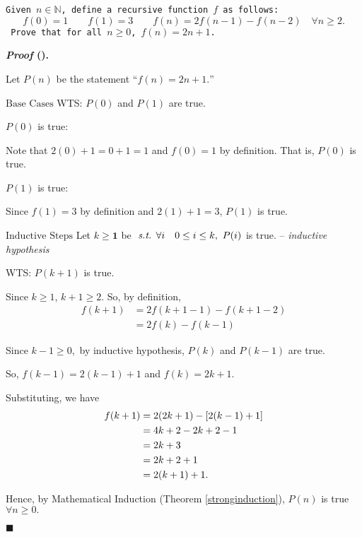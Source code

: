 \documentclass[12pt,a4paper]{article}
\newcounter{nprf}[subsection]
\newenvironment*{prf}{\par\indent\textbf{\textit{Proof} (\stepcounter{nprf}\thenprf). }\par}{\par\hfill $\blacksquare$\par}
\def\N{{\mathbb{N}}}
\def\st{\emph{ s.t. }}
\begin{document}
\begin{framed}
\noindent\texttt{Given $n\in\N$, define a recursive function $f$ as follows: \[f(0)=1\qquad f(1)=3\qquad f(n)=2f(n-1)-f(n-2)\quad\forall n\geq2.\] Prove that for all $n\geq0$, $f(n)=2n+1$.}
\begin{prf}
	Let $P(n)$ be the statement ``$f(n)=2n+1.$''\par$\boxed{\text{Base Cases}}$ 	WTS: $P(0)$ and $P(1)$ are true.\par\hspace{5mm} $P(0)$ is true: \big[WTS: $f(0)=2(0)+1$\big]\par\hspace{10mm}Note that $2(0)+1=0+1=1$ and $f(0)=1$ by definition. That is, $P(0)$ is true.\par\hspace{5mm} $P(1)$ is true: \big[WTS:$f(1)=2(1)+1$\big]\par\hspace{10mm} Since $f(1)=3$ by definition and $2(1)+1=3$, $P(1)$ is true. \par$\boxed{\text{Inductive Steps}}$ Let $k\geq\mathbf{1}$ be $\st\forall i\quad 0\leq i\leq k,\ P(i)$ is true. -- \textit{inductive hypothesis} \par\hspace{5mm} WTS: $P(k+1)$ is true. \par\hspace{5mm} Since $k\geq1$, $k+1\geq2$. So, by definition, \[\begin{aligned}f(k+1)&=2f(k+1-1)-f(k+1-2)\\&=2f(k)-f(k-1)\end{aligned}\]\par\hspace{5mm} Since $k-1\geq0,$ by inductive hypothesis, $P(k)$ and $P(k-1)$ are true.\par\hspace{5mm} So, $f(k-1)=2(k-1)+1$ and $f(k)=2k+1$.\par\hspace{5mm} Substituting, we have \[\begin{aligned}f(k+1)&=2(2k+1)-\qty[2(k-1)+1]\\&=4k+2-2k+2-1\\&=2k+3\\&=2k+2+1\\&=2(k+1)+1.\end{aligned}\]\par Hence, by Mathematical Induction (Theorem \ref{stronginduction}), $P(n)$ is true $\forall n\geq0.$
	\end{prf}
\end{framed}
\end{document}
